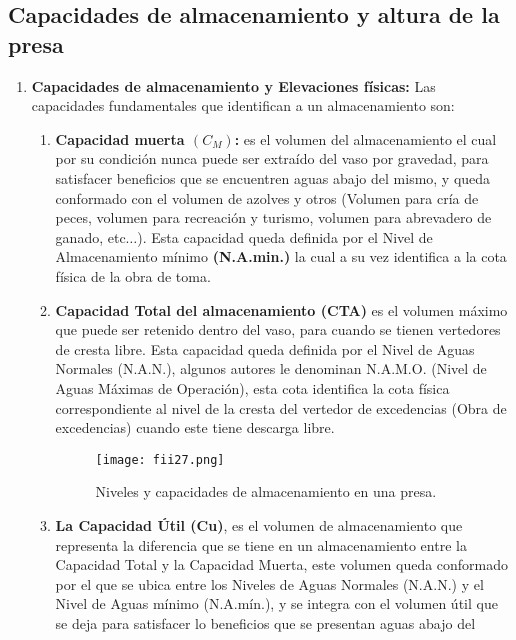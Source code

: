 \subsection{Capacidades de almacenamiento y altura de la presa}
\begin{enumerate}
	\item \textbf{Capacidades de almacenamiento y Elevaciones físicas:} Las capacidades fundamentales que identifican a un almacenamiento son:
	      \begin{enumerate}
		      \item \textbf{Capacidad muerta $(C_{M})$:} es el volumen del almacenamiento el cual por su
		            condición nunca puede ser extraído del vaso por gravedad, para satisfacer beneficios
		            que se encuentren aguas abajo del mismo, y queda conformado con el volumen de
		            azolves y otros (Volumen para cría de peces, volumen para recreación y turismo,
		            volumen para abrevadero de ganado, etc$\dots$). Esta capacidad queda definida por el Nivel
		            de Almacenamiento mínimo \textbf{(N.A.min.)} la cual a su vez identifica a la cota física de la
		            obra de toma.
		      \item \textbf{Capacidad Total del almacenamiento \textbf{(CTA)}} es el volumen máximo que
		            puede ser retenido dentro del vaso, para cuando se tienen vertedores de cresta libre.
		            Esta capacidad queda definida por el Nivel de Aguas Normales (N.A.N.), algunos
		            autores le denominan N.A.M.O. (Nivel de Aguas Máximas de Operación), esta cota
		            identifica la cota física correspondiente al nivel de la cresta del vertedor de excedencias
		            (Obra de excedencias) cuando este tiene descarga libre.
		            \begin{figure}[h!]
			            \centerline{\texttt{[image: fii27.png]}}
			            \caption{Niveles y capacidades de almacenamiento en una presa.}
			            \label{fii27}
		            \end{figure}
		      \item \textbf{La Capacidad Útil \textbf{(Cu)}}, es el volumen de almacenamiento que representa la
		            diferencia que se tiene en un almacenamiento entre la Capacidad Total y la Capacidad
		            Muerta, este volumen queda conformado por el que se ubica entre los Niveles de
		            Aguas Normales (N.A.N.) y el Nivel de Aguas mínimo (N.A.mín.), y se integra con el
		            volumen útil que se deja para satisfacer lo beneficios que se presentan aguas abajo del

\end{enumerate}
\end{enumerate}
